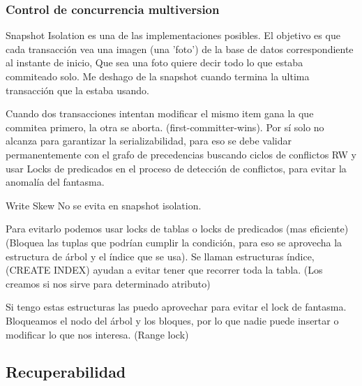 \subsubsection*{Control de concurrencia multiversion}
Snapshot Isolation es una de las implementaciones posibles. El objetivo es que cada transacción vea una imagen (una 'foto') de la base de datos correspondiente al instante de inicio, Que sea una foto quiere decir todo lo que estaba commiteado solo. Me deshago de la snapshot cuando termina la ultima transacción que la estaba usando.

\medskip
Cuando dos transacciones intentan modificar el mismo item gana la que commitea primero, la otra se aborta. (first-committer-wins). Por sí solo no alcanza para garantizar la serializabilidad, para eso se debe validar permanentemente con el grafo de precedencias buscando ciclos de conflictos RW y usar Locks de predicados en el proceso de detección de conflictos, para evitar la anomalía del fantasma.

\medskip
Write Skew
No se evita en snapshot isolation.

\medskip
Para evitarlo podemos usar locks de tablas o locks de predicados (mas eficiente) (Bloquea las tuplas que podrían cumplir la condición, para eso se aprovecha la estructura de árbol y el índice que se usa). Se llaman estructuras índice, (CREATE INDEX) ayudan a evitar tener que recorrer toda la tabla. (Los creamos si nos sirve para determinado atributo)

\medskip
Si tengo estas estructuras las puedo aprovechar para evitar el lock de fantasma. Bloqueamos el nodo del árbol y los bloques, por lo que nadie puede insertar o modificar lo que nos interesa. (Range lock)


\subsection*{Recuperabilidad}

